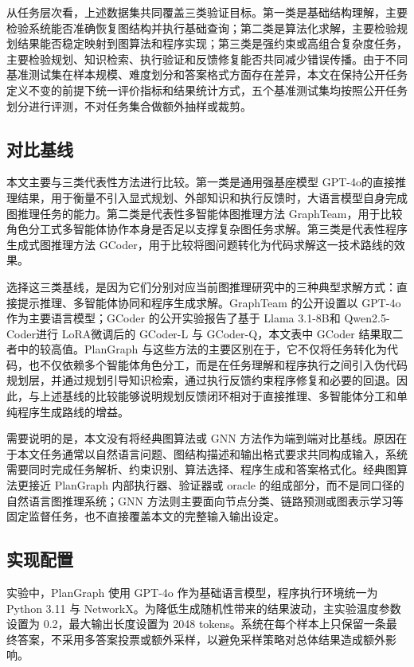 从任务层次看，上述数据集共同覆盖三类验证目标。第一类是基础结构理解，主要检验系统能否准确恢复图结构并执行基础查询；第二类是算法化求解，主要检验规划结果能否稳定映射到图算法和程序实现；第三类是强约束或高组合复杂度任务，主要检验规划、知识检索、执行验证和反馈修复能否共同减少错误传播。由于不同基准测试集在样本规模、难度划分和答案格式方面存在差异，本文在保持公开任务定义不变的前提下统一评价指标和结果统计方式，五个基准测试集均按照公开任务划分进行评测，不对任务集合做额外抽样或裁剪。

\subsection{对比基线}

本文主要与三类代表性方法进行比较。第一类是通用强基座模型 GPT-4o\cite{openai2024gpt4o}的直接推理结果，用于衡量不引入显式规划、外部知识和执行反馈时，大语言模型自身完成图推理任务的能力。第二类是代表性多智能体图推理方法 GraphTeam\cite{li2024graphteam}，用于比较角色分工式多智能体协作本身是否足以支撑复杂图任务求解。第三类是代表性程序生成式图推理方法 GCoder\cite{zhang2025gcoder}，用于比较将图问题转化为代码求解这一技术路线的效果。

选择这三类基线，是因为它们分别对应当前图推理研究中的三种典型求解方式：直接提示推理、多智能体协同和程序生成求解。GraphTeam 的公开设置以 GPT-4o 作为主要语言模型；GCoder 的公开实验报告了基于 Llama 3.1-8B\cite{dubey2024llama3}和 Qwen2.5-Coder\cite{hui2024qwen25coder}进行 LoRA\cite{hu2022lora}微调后的 GCoder-L 与 GCoder-Q，本文表中 GCoder 结果取二者中的较高值。PlanGraph 与这些方法的主要区别在于，它不仅将任务转化为代码，也不仅依赖多个智能体角色分工，而是在任务理解和程序执行之间引入伪代码规划层，并通过规划引导知识检索，通过执行反馈约束程序修复和必要的回退。因此，与上述基线的比较能够说明规划反馈闭环相对于直接推理、多智能体分工和单纯程序生成路线的增益。

需要说明的是，本文没有将经典图算法或 GNN 方法作为端到端对比基线。原因在于本文任务通常以自然语言问题、图结构描述和输出格式要求共同构成输入，系统需要同时完成任务解析、约束识别、算法选择、程序生成和答案格式化。经典图算法更接近 PlanGraph 内部执行器、验证器或 oracle 的组成部分，而不是同口径的自然语言图推理系统；GNN 方法则主要面向节点分类、链路预测或图表示学习等固定监督任务，也不直接覆盖本文的完整输入输出设定。

\subsection{实现配置}

实验中，PlanGraph 使用 GPT-4o 作为基础语言模型，程序执行环境统一为 Python 3.11 与 NetworkX\cite{hagberg2008networkx}。为降低生成随机性带来的结果波动，主实验温度参数设置为 0.2，最大输出长度设置为 2048 tokens。系统在每个样本上只保留一条最终答案，不采用多答案投票或额外采样，以避免采样策略对总体结果造成额外影响。

